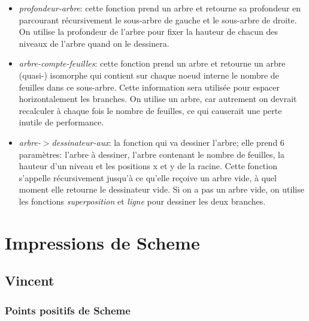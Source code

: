\documentclass[10pt]{article}
\begin{document}
\begin{itemize}
\item \emph{profondeur-arbre}: cette fonction prend un arbre et
  retourne sa profondeur en parcourant récursivement le sous-arbre de
  gauche et le sous-arbre de droite.  On utilise la profondeur de
  l'arbre pour fixer la hauteur de chacun des niveaux de l'arbre quand
  on le dessinera.
\item \emph{arbre-compte-feuilles}: cette fonction prend un arbre et
  retourne un arbre (quasi-) isomorphe qui contient sur chaque noeud
  interne le nombre de feuilles dans ce sous-arbre.  Cette information
  sera utilisée pour espacer horizontalement les branches.  On utilise
  un arbre, car autrement on devrait recalculer à chaque fois le
  nombre de feuilles, ce qui causerait une perte inutile de
  performance.
\item \emph{arbre-$>$dessinateur-aux}: la fonction qui va dessiner
  l'arbre; elle prend 6 paramètres: l'arbre à dessiner, l'arbre
  contenant le nombre de feuilles, la hauteur d'un niveau et les
  positions x et y de la racine.  Cette fonction s'appelle
  récursivement jusqu'à ce qu'elle reçoive un arbre vide, à quel
  moment elle retourne le dessinateur vide.  Si on a pas un arbre
  vide, on utilise les fonctions \emph{superposition} et \emph{ligne}
  pour dessiner les deux branches.
\end{itemize}




\section{Impressions de Scheme}

\subsection{Vincent}

\subsubsection{Points positifs de Scheme}
\end{document}
